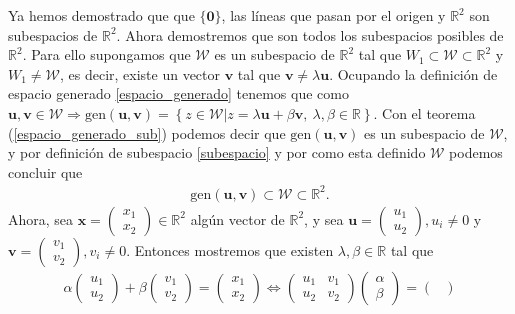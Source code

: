 \documentclass[11pt,letterpaper]{article}
\newcommand{\mR}{\mathbb{R}}
\newcommand{\gen}{\text{gen}}
\begin{document}
\begin{enumerate}
Ya hemos demostrado que que $\{\textbf{0}\}$, las líneas que pasan por el origen y $\mR^2$ son subespacios de $\mR^2$. Ahora demostremos que son todos los subespacios posibles de $\mR^2$. Para ello supongamos que $\mathcal{W}$ es un subespacio de $\mR^2$ tal que $W_1\subset \mathcal{W}\subset \mR^2$ y $W_1\neq \mathcal{W}$, es decir, existe un vector $\textbf{v}$ tal que $\textbf{v}\neq \lambda\textbf{u}$. Ocupando la definición de espacio generado \ref{espacio_generado} tenemos que como $\textbf{u},\textbf{v}\in \mathcal{W} \Rightarrow \gen (\textbf{u},\textbf{v})=\left\{z\in \mathcal{W}|z=\lambda \textbf{u}+\beta \textbf{v}, \ \lambda, \beta \in \mR\right\}.$ Con el teorema (\ref{espacio_generado_sub}) podemos decir que $\gen(\textbf{u},\textbf{v})$ es un subespacio de $\mathcal{W}$, y por definición de subespacio \ref{subespacio} y por como esta definido $\mathcal{W}$ podemos concluir que 
\begin{align}\label{parte_1}
\gen(\textbf{u},\textbf{v})\subset \mathcal{W}\subset \mR^2.
\end{align}
Ahora, sea $\textbf{x}=\begin{pmatrix}
x_1\\
x_2
\end{pmatrix}\in \mR^2$ algún vector de $\mR^2$, y sea $\textbf{u}=\begin{pmatrix}
u_1\\
u_2
\end{pmatrix}, u_i\neq 0$ y $\textbf{v}=\begin{pmatrix}
v_1\\
v_2
\end{pmatrix}, v_i\neq 0.$ Entonces mostremos que existen $\lambda, \beta\in \mR$ tal que 
\begin{align*}
\alpha\begin{pmatrix}
u_1\\
u_2
\end{pmatrix} +\beta \begin{pmatrix}
v_1\\
v_2
\end{pmatrix}=\begin{pmatrix}
x_1\\
x_2
\end{pmatrix} \Leftrightarrow \begin{pmatrix}
u_1&v_1\\
u_2&v_2
\end{pmatrix}\begin{pmatrix}
\alpha\\
\beta
\end{pmatrix}=\begin{pmatrix}

\end{pmatrix}
\end{align*}
\end{enumerate}
\end{document}
